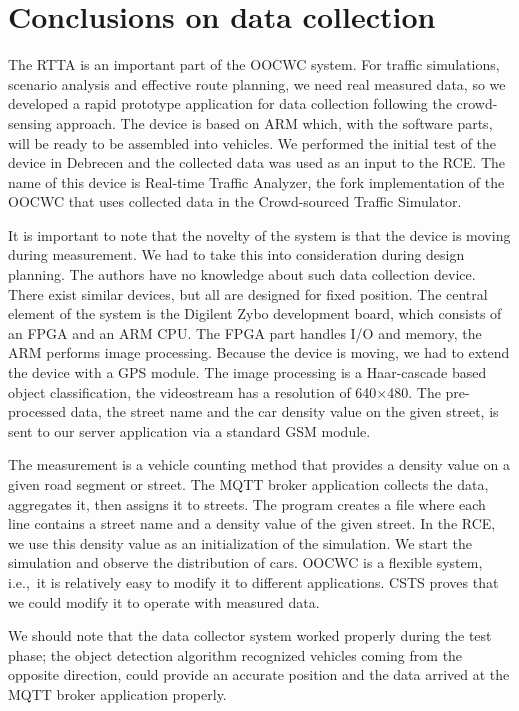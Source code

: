 \documentclass[b5paper,12pt]{report}
\theoremstyle{definition}
\begin{document}
\section{Conclusions on data collection}

The RTTA is an important part of the OOCWC system. For traffic simulations, scenario analysis and effective route planning, we need real measured data, so we developed a rapid prototype application for data collection following the crowd-sensing approach. The device is based on ARM which, with the software parts, will be ready to be assembled into vehicles. We performed the initial test of the device in Debrecen and the collected data was used as an input to the RCE. The name of this device is Real-time Traffic Analyzer, the fork implementation of the OOCWC that uses collected data in the Crowd-sourced Traffic Simulator.

It is important to note that the novelty of the system is that the device is moving during measurement. We had to take this into consideration during design planning. The authors have no knowledge about such data collection device. There exist similar devices, but all are designed for fixed position. The central element of the system is the Digilent Zybo development board, which consists of an FPGA and an ARM CPU. The FPGA part handles I/O and memory, the ARM performs image processing. Because the device is moving, we had to extend the device with a GPS module. The image processing is a Haar-cascade based object classification, the videostream has a resolution of 640$\times$480. The pre-processed data, the street name and the car density value on the given street, is sent to our server application via a standard GSM module.

The measurement is a vehicle counting method that provides a density value on a given road segment or street. The MQTT broker application collects the data, aggregates it, then assigns it to streets. The program creates a file where each line contains a street name and a density value of the given street. In the RCE, we use this density value as an initialization of the simulation. We start the simulation and observe the distribution of cars. OOCWC is a flexible system, i.e.,~it is relatively easy to modify it to different applications. CSTS proves that we could modify it to operate with measured data.

We should note that the data collector system worked properly during the test phase; the object detection algorithm recognized vehicles coming from the opposite direction, could provide an accurate position and the data arrived at the MQTT broker application properly.
\end{document}
